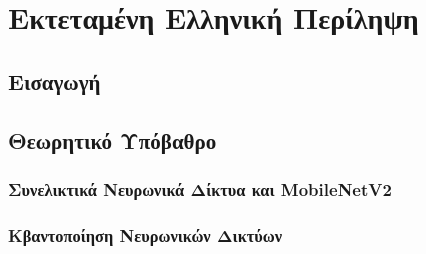 %
%
%
\chapter*{Εκτεταμένη Ελληνική Περίληψη}
\label{ch:greek-summary}


\section{Εισαγωγή}

\section{Θεωρητικό Υπόβαθρο}

\subsection{Συνελικτικά Νευρωνικά Δίκτυα και \textlatin{MobileNetV2}}

\subsection{Κβαντοποίηση Νευρωνικών Δικτύων}

